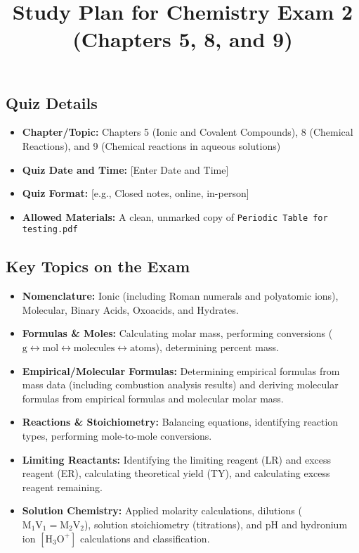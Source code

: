 \documentclass{article}
\title{Study Plan for Chemistry Exam 2 (Chapters 5, 8, and 9)}
\begin{document}
\maketitle

\subsection*{Quiz Details}
\begin{itemize}
    \item \textbf{Chapter/Topic:} Chapters 5 (Ionic and Covalent Compounds), 8 (Chemical Reactions), and 9 (Chemical reactions in aqueous solutions)
    \item \textbf{Quiz Date and Time:} [Enter Date and Time]
    \item \textbf{Quiz Format:} [e.g., Closed notes, online, in-person]
    \item \textbf{Allowed Materials:} A clean, unmarked copy of \texttt{Periodic Table for testing.pdf}
\end{itemize}

\subsection*{Key Topics on the Exam}
\begin{itemize}
    \item \textbf{Nomenclature:} Ionic (including Roman numerals and polyatomic ions), Molecular, Binary Acids, Oxoacids, and Hydrates.
    \item \textbf{Formulas \& Moles:} Calculating molar mass, performing conversions ($\text{g} \leftrightarrow \text{mol} \leftrightarrow \text{molecules} \leftrightarrow \text{atoms}$), determining percent mass.
    \item \textbf{Empirical/Molecular Formulas:} Determining empirical formulas from mass data (including combustion analysis results) and deriving molecular formulas from empirical formulas and molecular molar mass.
    \item \textbf{Reactions \& Stoichiometry:} Balancing equations, identifying reaction types, performing mole-to-mole conversions.
    \item \textbf{Limiting Reactants:} Identifying the limiting reagent (LR) and excess reagent (ER), calculating theoretical yield (TY), and calculating excess reagent remaining.
    \item \textbf{Solution Chemistry:} Applied molarity calculations, dilutions ($\text{M}_1\text{V}_1 = \text{M}_2\text{V}_2$), solution stoichiometry (titrations), and $\text{pH}$ and hydronium ion $[\text{H}_3\text{O}^+]$ calculations and classification.
\end{itemize}
\end{document}
